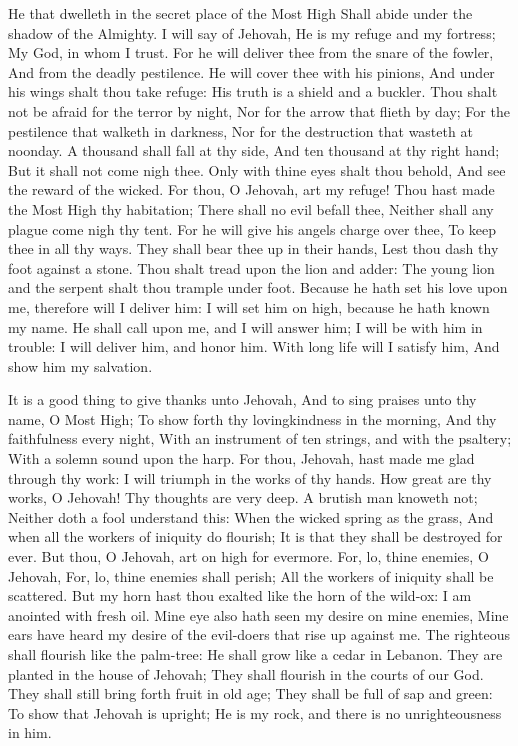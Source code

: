He that dwelleth in the secret place of the Most High Shall abide under the shadow of the Almighty.  I will say of Jehovah, He is my refuge and my fortress; My God, in whom I trust.  For he will deliver thee from the snare of the fowler, And from the deadly pestilence.  He will cover thee with his pinions, And under his wings shalt thou take refuge: His truth is a shield and a buckler.  Thou shalt not be afraid for the terror by night, Nor for the arrow that flieth by day;  For the pestilence that walketh in darkness, Nor for the destruction that wasteth at noonday.  A thousand shall fall at thy side, And ten thousand at thy right hand; But it shall not come nigh thee.  Only with thine eyes shalt thou behold, And see the reward of the wicked.  For thou, O Jehovah, art my refuge! Thou hast made the Most High thy habitation;  There shall no evil befall thee, Neither shall any plague come nigh thy tent.  For he will give his angels charge over thee, To keep thee in all thy ways.  They shall bear thee up in their hands, Lest thou dash thy foot against a stone.  Thou shalt tread upon the lion and adder: The young lion and the serpent shalt thou trample under foot.  Because he hath set his love upon me, therefore will I deliver him: I will set him on high, because he hath known my name.  He shall call upon me, and I will answer him; I will be with him in trouble: I will deliver him, and honor him.  With long life will I satisfy him, And show him my salvation. 

It is a good thing to give thanks unto Jehovah, And to sing praises unto thy name, O Most High;  To show forth thy lovingkindness in the morning, And thy faithfulness every night,  With an instrument of ten strings, and with the psaltery; With a solemn sound upon the harp.  For thou, Jehovah, hast made me glad through thy work: I will triumph in the works of thy hands.  How great are thy works, O Jehovah! Thy thoughts are very deep.  A brutish man knoweth not; Neither doth a fool understand this:  When the wicked spring as the grass, And when all the workers of iniquity do flourish; It is that they shall be destroyed for ever.  But thou, O Jehovah, art on high for evermore.  For, lo, thine enemies, O Jehovah, For, lo, thine enemies shall perish; All the workers of iniquity shall be scattered.  But my horn hast thou exalted like the horn of the wild-ox: I am anointed with fresh oil.  Mine eye also hath seen my desire on mine enemies, Mine ears have heard my desire of the evil-doers that rise up against me.  The righteous shall flourish like the palm-tree: He shall grow like a cedar in Lebanon.  They are planted in the house of Jehovah; They shall flourish in the courts of our God.  They shall still bring forth fruit in old age; They shall be full of sap and green:  To show that Jehovah is upright; He is my rock, and there is no unrighteousness in him. 

